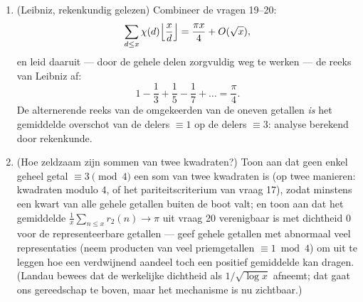 \begin{problem}
\begin{enumerate}[resume]
  \item (Leibniz, rekenkundig gelezen) Combineer de vragen 19--20:
        \[
        \sum_{d \leq x}\chi(d)\Bigl\lfloor\frac
        xd\Bigr\rfloor = \frac{\pi x}4 + O(\sqrt x),
        \]
        en leid daaruit --- door de gehele delen zorgvuldig weg te
        werken --- de reeks van Leibniz af:
        \[
        1 - \frac13 + \frac15 - \frac17 + \dots = \frac\pi4 .
        \]
        De alternerende reeks van de omgekeerden van de oneven
        getallen \emph{is} het gemiddelde overschot van de delers
        $\equiv 1$ op de delers $\equiv 3$: analyse berekend door
        rekenkunde.
  \item (Hoe zeldzaam zijn sommen van twee kwadraten?) Toon aan dat
        geen enkel geheel getal $\equiv 3 \pmod 4$ een som van twee
        kwadraten is (op twee manieren: kwadraten modulo $4$, of
        het pariteitscriterium van vraag 17), zodat minstens een
        kwart van alle gehele getallen buiten de boot valt; en toon
        aan dat het gemiddelde $\frac1x\sum_{n\leq x}r_2(n) \to
        \pi$ uit vraag 20 verenigbaar is met dichtheid $0$ voor de
        representeerbare getallen --- geef gehele getallen met
        abnormaal veel representaties (neem producten van veel
        priemgetallen $\equiv 1 \bmod 4$) om uit te leggen hoe een
        verdwijnend aandeel toch een positief gemiddelde kan
        dragen. (Landau bewees dat de werkelijke dichtheid als
        $1/\sqrt{\log x}$ afneemt; dat gaat ons gereedschap te
        boven, maar het mechanisme is nu zichtbaar.)
\end{enumerate}


\end{problem}
